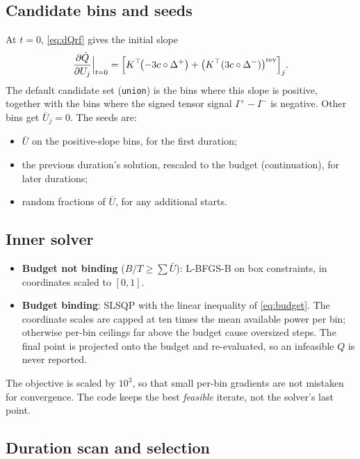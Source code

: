 \documentclass[11pt]{article}
\newcommand{\Iplus}{I^{+}}
\newcommand{\Iminus}{I^{-}}
\newcommand{\code}[1]{\texttt{#1}}
\begin{document}
\subsection{Candidate bins and seeds}
\label{sec:candidates}

At \(t=0\), \cref{eq:dQrf} gives the initial slope
\begin{equation}
\frac{\partial\dot Q}{\partial U_j}\Big|_{t=0}=\Bigl[K^\top\!\bigl(-3c\circ\Delta^+\bigr)+\bigl(K^\top(3c\circ\Delta^-)\bigr)^{\rm rev}\Bigr]_j .
\end{equation}
The default candidate set (\code{union}) is the bins where this slope is positive, together with
the bins where the signed tensor signal \(\Iplus-\Iminus\) is negative. Other bins get
\(\bar U_j=0\). The seeds are:
\begin{itemize}
\item \(\bar U\) on the positive-slope bins, for the first duration;
\item the previous duration's solution, rescaled to the budget (continuation), for later
durations;
\item random fractions of \(\bar U\), for any additional starts.
\end{itemize}

\subsection{Inner solver}

\begin{itemize}
\item \textbf{Budget not binding} (\(B/T\ge\sum\bar U\)): L-BFGS-B \cite{Byrd1995} on box
constraints, in coordinates scaled to \([0,1]\).
\item \textbf{Budget binding}: SLSQP \cite{Kraft1988} with the linear inequality of
\cref{eq:budget}. The coordinate scales are capped at ten times the mean available power per bin;
otherwise per-bin ceilings far above the budget cause oversized steps. The final point is
projected onto the budget and re-evaluated, so an infeasible \(Q\) is never reported.
\end{itemize}
The objective is scaled by \(10^3\), so that small per-bin gradients are not mistaken for
convergence. The code keeps the best \emph{feasible} iterate, not the solver's last point.

\subsection{Duration scan and selection}
\end{document}
